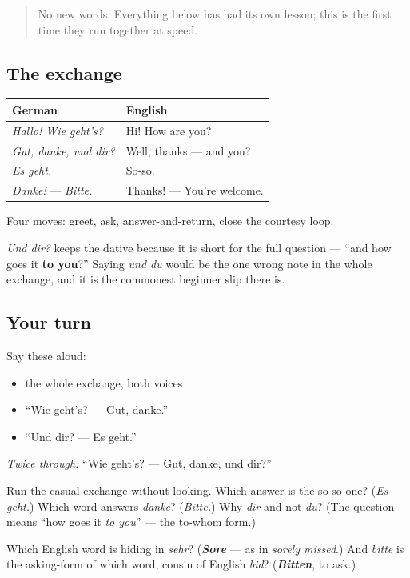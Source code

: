 \begin{quote}
No new words. Everything below has had its own lesson; this is the first time they run together at speed.
\end{quote}

\subsection*{The exchange}
\noindent
\begin{tabularx}{\linewidth}{@{}>{\raggedright\arraybackslash}X>{\raggedright\arraybackslash}X@{}}
\toprule
\textbf{German} & \textbf{English} \\
\midrule
\emph{Hallo! Wie geht's?} & Hi! How are you? \\
\emph{Gut, danke, und dir?} & Well, thanks — and you? \\
\emph{Es geht.} & So-so. \\
\emph{Danke!} — \emph{Bitte.} & Thanks! — You're welcome. \\
\bottomrule
\end{tabularx}

Four moves: greet, ask, answer-and-return, close the courtesy loop.

\begin{grammarlens}[title={Grammar Lens: why dir, and not du}]
\emph{Und dir?} keeps the dative because it is short for the full question — \textquotedblleft{}and how goes it \textbf{to you}?\textquotedblright{} Saying \emph{und du} would be the one wrong note in the whole exchange, and it is the commonest beginner slip there is.
\end{grammarlens}

\subsection*{Your turn}
Say these aloud:

\begin{itemize}
\raggedright
  \item the whole exchange, both voices
  \item \textquotedblleft{}Wie geht's? — Gut, danke.\textquotedblright{}
  \item \textquotedblleft{}Und dir? — Es geht.\textquotedblright{}
\end{itemize}

\emph{Twice through:} \textquotedblleft{}Wie geht's? — Gut, danke, und dir?\textquotedblright{}

\begin{tcolorbox}[breakable,colback=teal!4,colframe=teal!35!black,title={Before you move on}]
Run the casual exchange without looking. Which answer is the so-so one? (\emph{Es geht.}) Which word answers \emph{danke}? (\emph{Bitte.}) Why \emph{dir} and not \emph{du}? (The question means \textquotedblleft{}how goes it \emph{to you}\textquotedblright{} — the to-whom form.)

Which English word is hiding in \emph{sehr}? (\emph{\textbf{Sore}} — as in \emph{sorely missed}.) And \emph{bitte} is the asking-form of which word, cousin of English \emph{bid}? (\emph{\textbf{Bitten}}, to ask.)
\end{tcolorbox}
